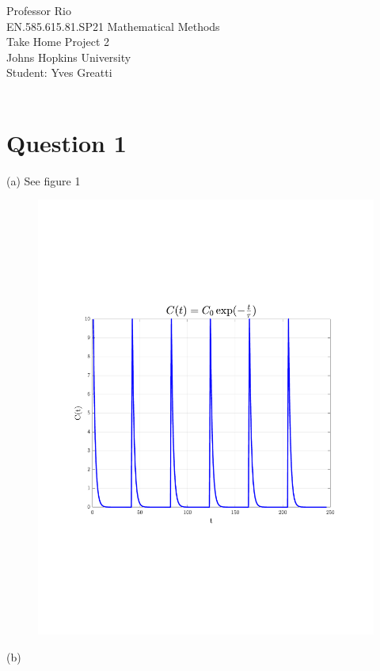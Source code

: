 \documentclass[12pt,twoside]{article}
\begin{document}
\noindent Professor Rio\\
EN.585.615.81.SP21 Mathematical Methods\\
Take Home Project 2\\
Johns Hopkins University\\
Student: Yves Greatti\\\

\section*{Question 1}

\be

\item [(a)] See figure 1

\begin{figure}[!h]
 \centering
 \includegraphics[scale=0.3]{exp_tau}
  \vspace{-5em}
 \caption{}
\end{figure}


\item [(b)]
\end{document}
